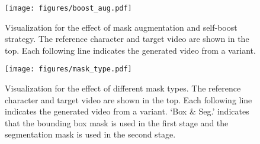 \begin{table}[!htb]
  \centering
  \tabcolsep=1mm
  \caption{The effect of different mask types. `Box \& Seg.' indicates that the  bounding box mask is used in the first stage and the segmentation mask is used in the second stage. 
  }
  \label{tab:mask_type}%
\end{table}%






\begin{figure}[t]
    \centering
    \texttt{[image: figures/boost\_aug.pdf]}
    \caption{Visualization for the effect of mask augmentation and self-boost strategy. The reference character and target video are shown in the top. Each following line indicates the generated video from a variant.}
    \label{fig:boost_aug}
\end{figure}













\begin{figure}[!htb]
    \centering
    \texttt{[image: figures/mask\_type.pdf]}
    \caption{Visualization for the effect of different mask types. The reference character and target video are shown in the top. Each following line indicates the generated video from a variant. `Box \& Seg.' indicates that the  bounding box mask is used in the first stage and the segmentation mask is used in the second stage.}
    \label{fig:mask_type}
\end{figure}



